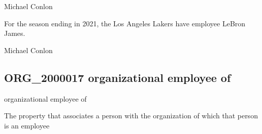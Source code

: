 \documentclass[letterpaper,10pt,english]{sphinxmanual}
\begin{document}
\begin{sphinxShadowBox}

\sphinxAtStartPar
Michael Conlon 
\end{sphinxShadowBox}

\begin{sphinxShadowBox}

\sphinxAtStartPar
For the season ending in 2021, the Los Angeles Lakers have employee LeBron James.
\end{sphinxShadowBox}

\begin{sphinxShadowBox}

\sphinxAtStartPar
{}
\end{sphinxShadowBox}

\begin{sphinxShadowBox}

\sphinxAtStartPar
Michael Conlon 
\end{sphinxShadowBox}
\begin{quote}

\ignorespaces \end{quote}


\subsection{ORG\_2000017 \sphinxhyphen{} organizational employee of}
\label{\detokenize{doc-ORG_2000017:org-2000017-organizational-employee-of}}\label{\detokenize{doc-ORG_2000017:index-0}}\label{\detokenize{doc-ORG_2000017::doc}}
\begin{sphinxShadowBox}

\sphinxAtStartPar
organizational employee of
\end{sphinxShadowBox}

\begin{sphinxShadowBox}

\sphinxAtStartPar
The property that associates a person with the organization of which that person is an employee
\end{sphinxShadowBox}
\end{document}
